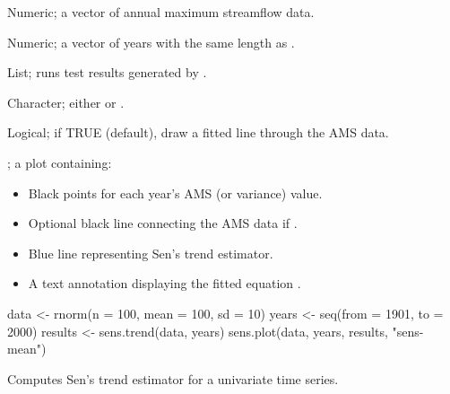 \documentclass[a4paper]{book}
\begin{document}
%
\begin{Arguments}
\begin{ldescription}
\item[\code{data}] Numeric; a vector of annual maximum streamflow data.

\item[\code{years}] Numeric; a vector of years with the same length as .

\item[\code{results}] List; runs test results generated by .

\item[\code{name}] Character; either  or .

\item[\code{show\_trend}] Logical; if TRUE (default), draw a fitted line through the AMS data.
\end{ldescription}
\end{Arguments}
%
\begin{Value}
; a plot containing:
\begin{itemize}

\item{} Black points for each year’s AMS (or variance) value.
\item{} Optional black line connecting the AMS data if .
\item{} Blue line representing Sen’s trend estimator.
\item{} A text annotation displaying the fitted equation .

\end{itemize}

\end{Value}
%
\begin{SeeAlso}
\end{SeeAlso}
%
\begin{Examples}
\begin{ExampleCode}
data <- rnorm(n = 100, mean = 100, sd = 10)
years <- seq(from = 1901, to = 2000)
results <- sens.trend(data, years)
sens.plot(data, years, results, "sens-mean")

\end{ExampleCode}
\end{Examples}
%
\begin{Description}
Computes Sen's trend estimator for a univariate time series.
\end{Description}
\end{document}

